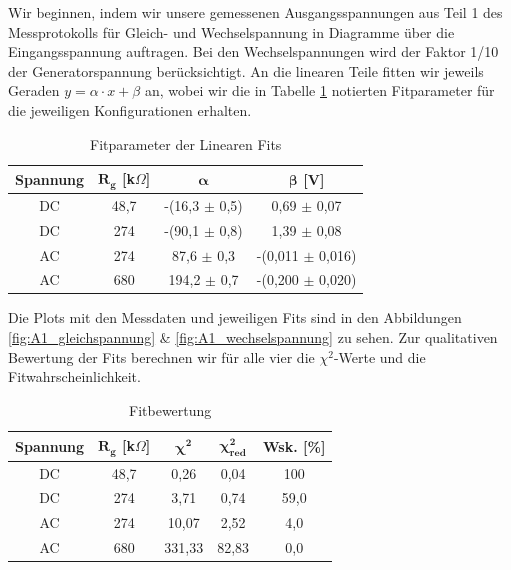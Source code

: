 \documentclass{article}
\begin{document}
Wir beginnen, indem wir unsere gemessenen Ausgangsspannungen aus Teil 1 des Messprotokolls für Gleich- und Wechselspannung in Diagramme über die Eingangsspannung auftragen. Bei den Wechselspannungen wird der Faktor 1/10 der Generatorspannung berücksichtigt. An die linearen Teile fitten wir jeweils Geraden $y = \alpha \cdot x + \beta$ an, wobei wir die in Tabelle \ref{tab:A1-Fitparameter} notierten Fitparameter für die jeweiligen Konfigurationen erhalten.

\phantom{.}

\begin{table}[!h]
    \centering
    \begin{tabular}{cccc}
        \hline
        \textbf{Spannung} & $\bm{R_g}$ [k$\Omega$] & $\bm{\alpha}$ & $\bm{\beta}$ [V]  \\ \hline
         DC & 48,7 & -(16,3 $\pm$ 0,5) & 0,69 $\pm$ 0,07 \\
         DC & 274  & -(90,1 $\pm$ 0,8) & 1,39 $\pm$ 0,08 \\
         AC & 274  & 87,6 $\pm$ 0,3    & -(0,011 $\pm$ 0,016) \\
         AC & 680  & 194,2 $\pm$ 0,7   & -(0,200 $\pm$ 0,020) \\ \hline
    \end{tabular}%
    \caption{Fitparameter der Linearen Fits}
    \label{tab:A1-Fitparameter}
\end{table}

\phantom{.}

Die Plots mit den Messdaten und jeweiligen Fits sind in den Abbildungen \ref{fig:A1_gleichspannung} \& \ref{fig:A1_wechselspannung} zu sehen. Zur qualitativen Bewertung der Fits berechnen wir für alle vier die $\chi^2$-Werte und die Fitwahrscheinlichkeit.

\phantom{.}

\begin{table}[!h]
    \centering
    \begin{tabular}{ccccc}
        \hline
        \textbf{Spannung} & $\bm{R_g}$ [k$\Omega$] & $\bm{\chi^2}$ & $\bm{\chi^2_{red}}$ & \textbf{Wsk.} [\%] \\ \hline
         DC & 48,7 & 0,26 & 0,04 & 100  \\
         DC & 274  & 3,71 & 0,74 & 59,0  \\
         AC & 274  & 10,07 & 2,52 & 4,0  \\
         AC & 680  & 331,33 & 82,83 & 0,0  \\ \hline
    \end{tabular}%
    \caption{Fitbewertung}
    \label{tab:A1-Fitbewertung}
\end{table}
\end{document}
